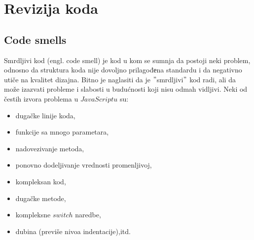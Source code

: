 \section{Revizija koda}

\subsection{Code smells}
Smrdljivi kod (engl. code smell) je kod u kom se sumnja da postoji neki problem, odnosno da struktura koda nije dovoljno prilagođеna standardu i da negativno utiče na kvalitet dizajna. Bitno je naglasiti da je $"$smrdljivi$"$ kod radi, ali da može izazvati probleme i slabosti u budućnosti koji nisu odmah vidljivi. Neki od čestih izvora problema u $JavaScriptu$ su:
\begin{itemize}
\item dugačke linije koda,
\item funkcije sa mnogo parametara,
\item nadovezivanje metoda,
\item ponovno dodeljivanje vrednosti promenljivoj,
\item kompleksan kod,
\item dugačke metode,
\item kompleksne $switch$ naredbe,
\item dubina (previše nivoa indentacije),itd.
\end{itemize}
